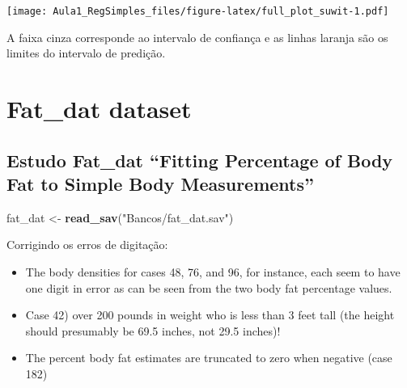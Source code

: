 \documentclass[]{article}
\newenvironment{Shaded}{\begin{snugshade}}{\end{snugshade}}
\newcommand{\KeywordTok}[1]{\textcolor[rgb]{0.13,0.29,0.53}{\textbf{#1}}}
\newcommand{\NormalTok}[1]{#1}
\newcommand{\StringTok}[1]{\textcolor[rgb]{0.31,0.60,0.02}{#1}}
\providecommand{\tightlist}{%
  \setlength{\itemsep}{0pt}\setlength{\parskip}{0pt}}
\begin{document}
\texttt{[image: Aula1\_RegSimples\_files/figure-latex/full\_plot\_suwit-1.pdf]}

A faixa cinza corresponde ao intervalo de confiança e as linhas laranja
são os limites do intervalo de predição.

\hypertarget{fat_dat-dataset}{%
\section{Fat\_dat dataset}\label{fat_dat-dataset}}

\hypertarget{estudo-fat_dat-fitting-percentage-of-body-fat-to-simple-body-measurements}{%
\subsection{Estudo Fat\_dat ``Fitting Percentage of Body Fat to Simple
Body
Measurements''}\label{estudo-fat_dat-fitting-percentage-of-body-fat-to-simple-body-measurements}}

\begin{Shaded}
\begin{Highlighting}[]
\NormalTok{fat_dat <-}\StringTok{ }\KeywordTok{read_sav}\NormalTok{(}\StringTok{"Bancos/fat_dat.sav"}\NormalTok{)}
\end{Highlighting}
\end{Shaded}

Corrigindo os erros de digitação:

\begin{itemize}
\tightlist
\item
  The body densities for cases 48, 76, and 96, for instance, each seem
  to have one digit in error as can be seen from the two body fat
  percentage values.
\item
  Case 42) over 200 pounds in weight who is less than 3 feet tall (the
  height should presumably be 69.5 inches, not 29.5 inches)!
\item
  The percent body fat estimates are truncated to zero when negative
  (case 182)
\end{itemize}
\end{document}

